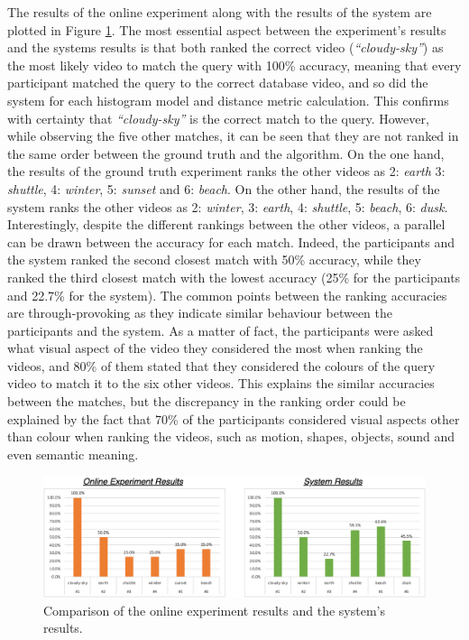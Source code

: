 The results of the online experiment along with the results of the system are plotted in Figure \ref{fig:evaluation-ground_truth_vs_system_results}. The most essential aspect between the experiment's results and the systems results is that both ranked the correct video (\textit{``cloudy-sky''}) as the most likely video to match the query with 100\% accuracy, meaning that every participant matched the query to the correct database video, and so did the system for each histogram model and distance metric calculation. This confirms with certainty that \textit{``cloudy-sky''} is the correct match to the query. However, while observing the five other matches, it can be seen that they are not ranked in the same order between the ground truth and the algorithm. On the one hand, the results of the ground truth experiment ranks the other videos as 2: \textit{earth} 3: \textit{shuttle}, 4: \textit{winter}, 5: \textit{sunset} and 6: \textit{beach}. On the other hand, the results of the system ranks the other videos as 2: \textit{winter}, 3: \textit{earth}, 4: \textit{shuttle}, 5: \textit{beach}, 6: \textit{dusk}. Interestingly, despite the different rankings between the other videos, a parallel can be drawn between the accuracy for each match. Indeed, the participants and the system ranked the second closest match with 50\% accuracy, while they ranked the third closest match with the lowest accuracy (25\% for the participants and 22.7\% for the system). The common points between the ranking accuracies are through-provoking as they indicate similar behaviour between the participants and the system. As a matter of fact, the participants were asked what visual aspect of the video they considered the most when ranking the videos, and 80\% of them stated that they considered the colours of the query video to match it to the six other videos. This explains the similar accuracies between the matches, but the discrepancy in the ranking order could be explained by the fact that 70\% of the participants considered visual aspects other than colour when ranking the videos, such as motion, shapes, objects, sound and even semantic meaning.

\begin{figure}[h] 
\centerline{\includegraphics[width=\textwidth]{figures/evaluation/ground_truth_vs_system_results.png}}
\caption{\label{fig:evaluation-ground_truth_vs_system_results}Comparison of the online experiment results and the system's results.}
\end{figure}

